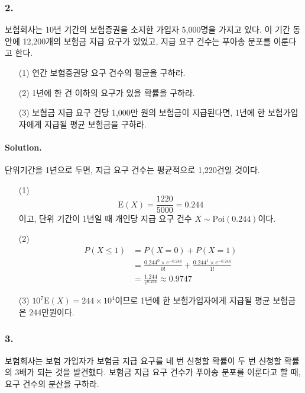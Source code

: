 \subsubsection{2.} 보험회사는 10년 기간의 보험증권을 소지한 가입자 5,000명을 가지고 있다. 이 기간 동안에 12,200개의 보험금 지급 요구가 있었고,
지급 요구 건수는 푸아송 분포를 이룬다고 한다.

\begin{itemize}
	\item [(1)] 연간 보험증권당 요구 건수의 평균을 구하라.
	\item [(2)] 1년에 한 건 이하의 요구가 있을 확률을 구하라.
	\item [(3)] 보혐금 지급 요구 건당 1,000만 원의 보험금이 지급된다면, 1년에 한 보험가입자에게 지급될 평균 보험금을 구하라.
\end{itemize}

\paragraph{Solution.} 단위기간을 1년으로 두면, 지급 요구 건수는 평균적으로 1,220건일 것이다.

\begin{itemize}
	\item [(1)] {
		\[\mathrm{E}\left(X\right) = \frac{1220}{5000} = 0.244\]
		이고, 단위 기간이 1년일 때 개인당 지급 요구 건수 $X \sim \mathrm{Poi}\left(0.244\right)$이다.
	}
	\item [(2)] {
		\begin{align*}
			P\left(X\leq 1\right) &= P\left(X=0\right) + P\left(X=1\right) \\
			&= \frac{0.244^0\times e^{-0.244}}{0!} + \frac{0.244^1\times e^{-0.244}}{1!} \\
			&= \frac{1.244}{e^{0.244}} \approx 0.9747
		\end{align*}
	}
	\item [(3)] $10^7 \mathrm{E}\left(X\right) = 244 \times 10^4$이므로 1년에 한 보험가입자에게 지급될 평균 보험금은 244만원이다.
\end{itemize}

\subsubsection{3.} 보험회사는 보험 가입자가 보험금 지급 요구를 네 번 신청할 확률이 두 번 신청할 확률의 3배가 되는 것을 발견했다.
보험금 지급 요구 건수가 푸아송 분포를 이룬다고 할 때, 요구 건수의 분산을 구하라.

